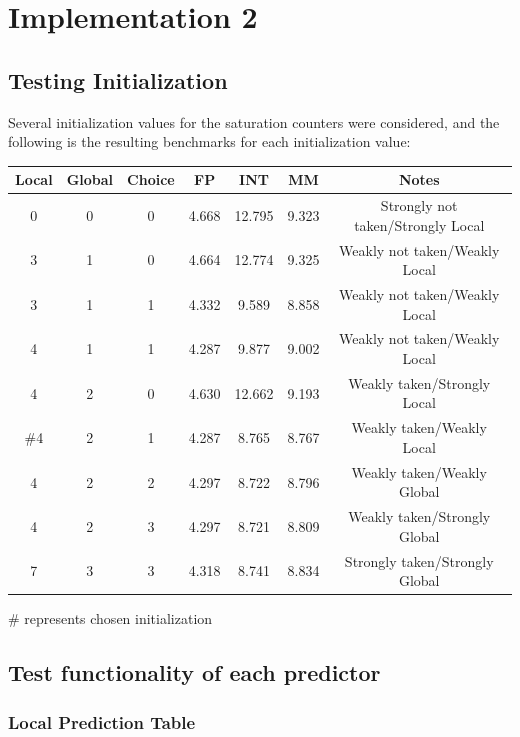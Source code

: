 \documentclass[]{report}   %
\begin{document}
\section{Implementation 2}

\subsection{Testing Initialization}
Several initialization values for the saturation counters were considered, and the following is the resulting benchmarks for each initialization value:

\begin{center}
  \begin{tabular} { c c c | c c c || c }
    Local & Global & Choice & FP & INT & MM & Notes\\
    \hline
    0 & 0 & 0 & 4.668 & 12.795 & 9.323 & Strongly not taken/Strongly Local\\
    3 & 1 & 0 & 4.664 & 12.774 & 9.325 & Weakly not taken/Weakly Local\\
    3 & 1 & 1 & 4.332 & 9.589 & 8.858 & Weakly not taken/Weakly Local\\
    4 & 1 & 1 & 4.287 & 9.877 & 9.002 & Weakly not taken/Weakly Local\\
    4 & 2 & 0 & 4.630 & 12.662 & 9.193 & Weakly taken/Strongly Local\\
    \#4 & 2 & 1 & 4.287 & 8.765 & 8.767 & Weakly taken/Weakly Local\\
    4 & 2 & 2 & 4.297 & 8.722 & 8.796 & Weakly taken/Weakly Global\\
    4 & 2 & 3 & 4.297 & 8.721 & 8.809 & Weakly taken/Strongly Global\\
    7 & 3 & 3 & 4.318 & 8.741 & 8.834 & Strongly taken/Strongly Global\\
  \end{tabular}
\end{center}
\# represents chosen initialization

\subsection{Test functionality of each predictor}
\subsubsection{Local Prediction Table}
\end{document}
